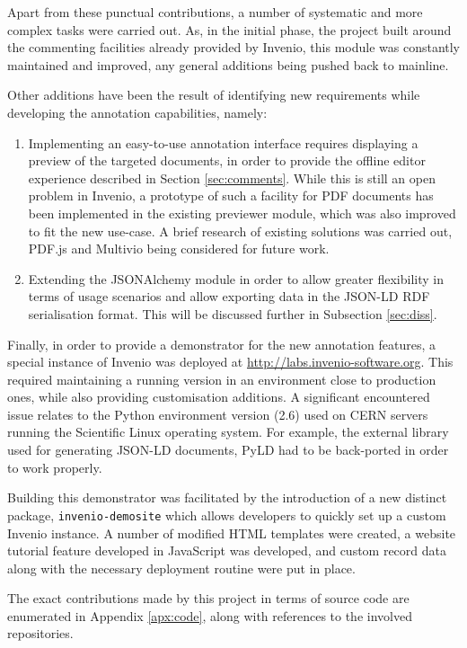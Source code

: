 Apart from these punctual contributions, a number of systematic and more
complex tasks were carried out. As, in the initial phase, the project built
around the commenting facilities already provided by Invenio, this module was
constantly maintained and improved, any general additions being pushed
back to mainline.

Other additions have been the result of identifying new requirements while
developing the annotation capabilities, namely:
\begin{enumerate}
  \item Implementing an easy-to-use annotation interface requires displaying a
        preview of the targeted documents, in order to provide the offline
        editor experience described in Section \ref{sec:comments}. While this
        is still an open problem in Invenio, a prototype of such a facility for
        PDF documents has been implemented in the existing previewer module,
        which was also improved to fit the new use-case. A brief research of
        existing solutions was carried out, PDF.js \cite{ref:pdfjs} and Multivio
        \cite{ref:multivio} being considered for future work.
  \item Extending the JSONAlchemy module in order to allow greater
        flexibility in terms of usage scenarios and allow exporting data in
        the JSON-LD RDF serialisation format. This will be discussed further in
        Subsection \ref{sec:diss}.
\end{enumerate}

Finally, in order to provide a demonstrator for the new annotation features, a
special instance of Invenio was deployed at
\url{http://labs.invenio-software.org}.  This required maintaining a running
version in an environment close to production ones, while also providing
customisation additions. A significant encountered issue relates to the Python
environment version (2.6) used on CERN servers running the Scientific Linux
operating system. For example, the external library used for generating JSON-LD
documents, PyLD \cite{ref:pyld} had to be back-ported in order to work properly.

Building this demonstrator was facilitated by the introduction of a new
distinct package, \texttt{invenio-demosite} which allows developers to quickly
set up a custom Invenio instance. A number of modified HTML templates were
created, a website tutorial feature developed in JavaScript was developed, and
custom record data along with the necessary deployment routine were put in
place.

The exact contributions made by this project in terms of source code are
enumerated in Appendix \ref{apx:code}, along with references to the involved
repositories.
